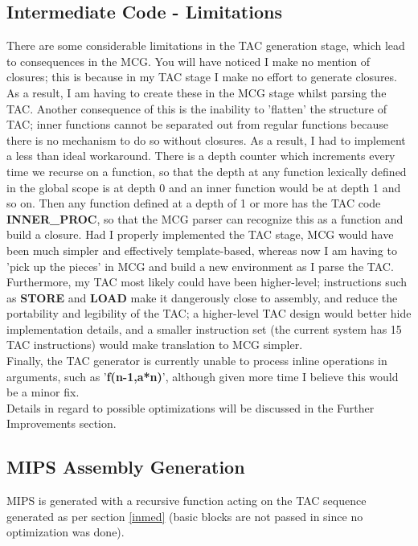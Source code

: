 \documentclass[12pt]{article}
\begin{document}
\subsection{Intermediate Code - Limitations}\label{limit}
There are some considerable limitations in the TAC generation stage, which lead to consequences in the MCG. You will have noticed I make no mention of closures; this is because in my TAC stage I make no effort to generate closures. As a result, I am having to create these in the MCG stage whilst parsing the TAC. Another consequence of this is the inability to 'flatten' the structure of TAC; inner functions cannot be separated out from regular functions because there is no mechanism to do so without closures. As a result, I had to implement a less than ideal workaround. There is a depth counter which increments every time we recurse on a function, so that the depth at any function lexically defined in the global scope is at depth 0 and an inner function would be at depth 1 and so on. Then any function defined at a depth of 1 or more has the TAC code \textbf{INNER\_PROC}, so that the MCG parser can recognize this as a function and build a closure.
Had I properly implemented the TAC stage, MCG would have been much simpler and effectively template-based, whereas now I am having to 'pick up the pieces' in MCG and build a new environment as I parse the TAC. 
\\\newline Furthermore, my TAC most likely could have been higher-level; instructions such as \textbf{STORE} and \textbf{LOAD} make it dangerously close to assembly, and reduce the portability and legibility of the TAC; a higher-level TAC design would better hide implementation details, and a smaller instruction set (the current system has 15 TAC instructions) would make translation to MCG simpler.
\\\newline Finally, the TAC generator is currently unable to process inline operations in arguments, such as '\textbf{f(n-1,a*n)}', although given more time I believe this would be a minor fix.
\\\newline Details in regard to possible optimizations will be discussed in the Further Improvements section.
\subsection{MIPS Assembly Generation}
MIPS is generated with a recursive function acting on the TAC sequence generated as per section \ref{inmed} (basic blocks are not passed in since no optimization was done).
\end{document}
